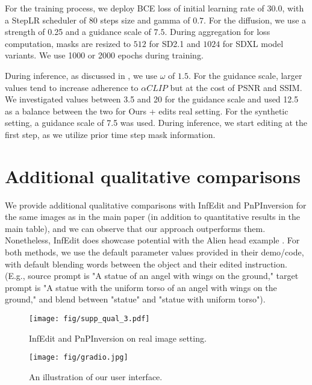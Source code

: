 For the training process, we deploy BCE loss of initial learning rate of $30.0$, with a StepLR scheduler of $80$ steps size and gamma of $0.7$. For the diffusion, we use a strength of 0.25 and a guidance scale of $7.5$. During aggregation for loss computation, masks are resized to $512$ for SD2.1 and $1024$ for SDXL model variants. We use 1000 or 2000 epochs during training. 

During inference, as discussed in , we use $\omega$ of $1.5$. For 
the guidance scale, larger values tend to increase adherence to $\alpha CLIP$ but at the cost of PSNR and SSIM. We investigated values between 3.5 and 20 for the guidance scale and used 12.5 as a balance between the two for Ours + edits real setting. For the synthetic setting, a guidance scale of 7.5 was used. During inference, we start editing at the first step, as we utilize prior time step mask information.


\section{Additional qualitative comparisons}
\label{sec:additional_qualitative_comparison}

We provide additional qualitative comparisons with InfEdit and PnPInversion for the same images as in the main paper (in addition to quantitative results in the main table), and we can observe that our approach outperforms them. Nonetheless, InfEdit does showcase potential with the Alien head example .
For both methods, we use the default parameter values provided in their demo/code, with default blending words between the object and their edited instruction. (E.g., source prompt is "A statue of an angel with wings on the ground," target prompt is "A statue with the uniform torso of an angel with wings on the ground," and blend between "statue" and "statue with uniform torso").


\begin{figure*}
    \centering
    \texttt{[image: fig/supp\_qual\_3.pdf]}
    \caption{InfEdit \citep{Xu_2024_CVPR_INFEDIT} and PnPInversion \citep{ju2023direct_PnPInversion} on real image setting.}
    \label{fig:abl_qual_2}
\end{figure*}

\begin{figure*}
    \centering
    \texttt{[image: fig/gradio.jpg]}
    \caption{An illustration of our user interface.}
    \label{fig:gradio}
\end{figure*}

